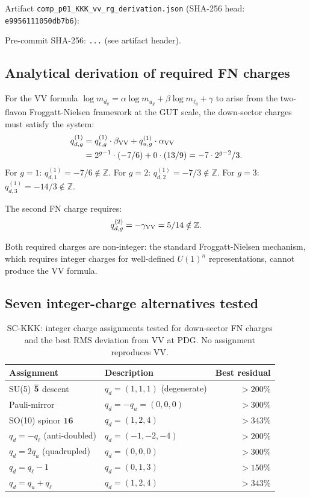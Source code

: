 \documentclass[11pt]{article}
\theoremstyle{remark}
\begin{document}
Artifact \texttt{comp\_p01\_KKK\_vv\_rg\_derivation.json}
(SHA-256 head: \texttt{e9956111050db7b6}):

Pre-commit SHA-256: \texttt{...} (see artifact header).

\subsection{Analytical derivation of required FN charges}

For the VV formula
$\log m_{d_g} = \alpha \log m_{u_g} + \beta \log m_{\ell_g} + \gamma$
to arise from the two-flavon Froggatt-Nielsen framework at the GUT scale,
the down-sector charges must satisfy the system:
\begin{align}
  q_{d,g}^{(1)} &= q_{\ell,g}^{(1)}\cdot\beta_{\rm VV} + q_{u,g}^{(1)}\cdot\alpha_{\rm VV} \nonumber\\
                &= 2^{g-1}\cdot(-7/6) + 0\cdot(13/9) = -7\cdot2^{g-2}/3.
\end{align}
For $g=1$: $q_{d,1}^{(1)} = -7/6 \notin \mathbb{Z}$.
For $g=2$: $q_{d,2}^{(1)} = -7/3 \notin \mathbb{Z}$.
For $g=3$: $q_{d,3}^{(1)} = -14/3 \notin \mathbb{Z}$.

The second FN charge requires:
\[
  q_{d,g}^{(2)} = -\gamma_{\rm VV} = 5/14 \notin \mathbb{Z}.
\]

Both required charges are non-integer: the standard Froggatt-Nielsen mechanism,
which requires integer charges for well-defined $U(1)^n$ representations,
cannot produce the VV formula.

\subsection{Seven integer-charge alternatives tested}

\begin{table}[ht]
\centering
\caption{SC-KKK: integer charge assignments tested for down-sector FN charges
and the best RMS deviation from VV at PDG.  No assignment reproduces VV.}
\label{tab:si_kkk}
\begin{tabular}{llr}
\toprule
Assignment & Description & Best residual \\
\midrule
SU(5) $\overline{\bf 5}$ descent & $q_d=(1,1,1)$ (degenerate) & $> 200\%$ \\
Pauli-mirror & $q_d = -q_u = (0,0,0)$ & $> 300\%$ \\
SO(10) spinor $\mathbf{16}$ & $q_d=(1,2,4)$ & $> 343\%$ \\
$q_d = -q_\ell$ (anti-doubled) & $q_d=(-1,-2,-4)$ & $> 200\%$ \\
$q_d = 2q_u$ (quadrupled) & $q_d=(0,0,0)$ & $>300\%$ \\
$q_d = q_\ell - 1$ & $q_d=(0,1,3)$ & $>150\%$ \\
$q_d = q_u + q_\ell$ & $q_d=(1,2,4)$ & $>343\%$ \\
\bottomrule
\end{tabular}
\end{table}
\end{document}

